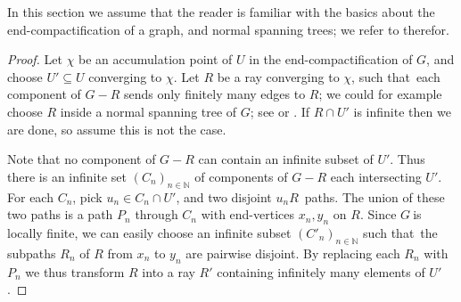 \documentclass{article}
\newcommand{\N}{\ensuremath{\mathbb N}}
\newcommand{\pths}[2]{\ensuremath{#1}\text{--}\ensuremath{#2}~paths}
\newcommand{\seq}[1]{\ensuremath{(#1_n)_{n\in\N}}}
\newcommand{\g}{\ensuremath{G\ }}
\newcommand{\G}{\ensuremath{G}}
\newcommand{\lf}{locally finite}
\newcommand{\st}{such that}
\begin{document}
In this section we assume that the reader is familiar with the basics about the end-compac\-ti\-fication of a graph, and normal spanning trees; we refer to \cite{diestelBook05} therefor.
\begin{proof}
Let $\chi$ be an accumulation point of $U$ in the end-compactification of \G, and choose $U'\subseteq U$ converging to $\chi$. Let $R$ be a ray converging to $\chi$, \st\ each component of $G - R$ sends only finitely many edges to $R$; we could for example choose $R$ inside a normal spanning tree of \G; see \cite[Exercise~8.27]{diestelBook05} or \cite[Lemma~11]{fleisch}. If $R\cap U'$ is infinite then we are done, so assume this is not the case. 

Note that no component of $G - R$ can contain an infinite subset of $U'$. Thus there is an infinite set $\seq{C}$ of components of $G - R$ each intersecting $U'$. For each $C_n$, pick $u_n\in C_n \cap U'$, and two disjoint \pths{u_n}{R}. The union of these two paths is a path $P_n$ through $C_n$ with end-vertices $x_n,y_n$ on $R$. Since \g is \lf, we can easily choose an infinite subset $\seq{C'}$ \st\ the subpaths $R_n$ of $R$ from $x_n$ to $y_n$ are pairwise disjoint. By replacing each $R_n$ with $P_n$ we thus transform $R$ into a ray $R'$ containing infinitely many elements of $U'$.

\end{proof}
\end{document}
